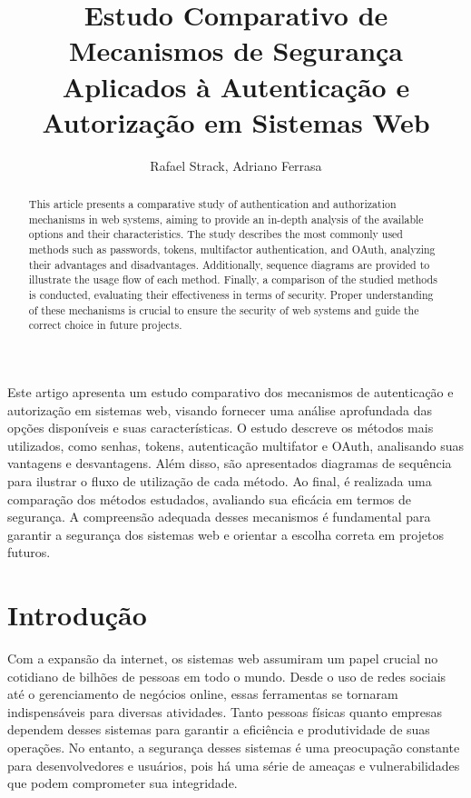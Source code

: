 \documentclass[12pt]{article}
\title{Estudo Comparativo de Mecanismos de Segurança Aplicados à Autenticação e Autorização em Sistemas Web}
\author{Rafael Strack\inst{1}, Adriano Ferrasa\inst{1}}
\begin{document}
\maketitle

\begin{abstract}
This article presents a comparative study of authentication and authorization 
mechanisms in web systems, aiming to provide an in-depth analysis of the 
available options and their characteristics. The study describes the most 
commonly used methods such as passwords, tokens, multifactor authentication, 
and OAuth, analyzing their advantages and disadvantages. Additionally, 
sequence diagrams are provided to illustrate the usage flow of each method. 
Finally, a comparison of the studied methods is conducted, evaluating their 
effectiveness in terms of security. Proper understanding of these mechanisms 
is crucial to ensure the security of web systems and guide the correct 
choice in future projects.
\end{abstract}
     
\begin{resumo}
Este artigo apresenta um estudo comparativo dos mecanismos de autenticação 
e autorização em sistemas web, visando fornecer uma análise aprofundada das 
opções disponíveis e suas características. O estudo descreve os métodos mais 
utilizados, como senhas, tokens, autenticação multifator e OAuth, analisando 
suas vantagens e desvantagens. Além disso, são apresentados diagramas de 
sequência para ilustrar o fluxo de utilização de cada método. Ao final, é 
realizada uma comparação dos métodos estudados, avaliando sua eficácia em 
termos de segurança. A compreensão adequada desses mecanismos é fundamental 
para garantir a segurança dos sistemas web e orientar a escolha correta em 
projetos futuros.
\end{resumo}


\section{Introdução}

Com a expansão da internet, os sistemas web assumiram um papel crucial no
cotidiano de bilhões de pessoas em todo o mundo. Desde o uso de redes sociais até
o gerenciamento de negócios online, essas ferramentas se tornaram indispensáveis
para diversas atividades. Tanto pessoas físicas quanto empresas dependem desses
sistemas para garantir a eficiência e produtividade de suas operações. No entanto, a
segurança desses sistemas é uma preocupação constante para desenvolvedores e
usuários, pois há uma série de ameaças e vulnerabilidades que podem comprometer
sua integridade.
\end{document}
